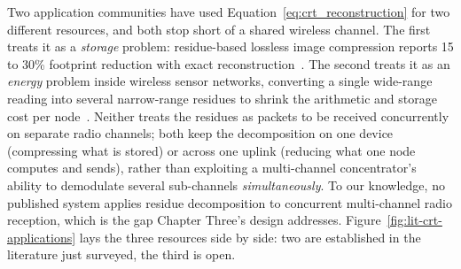 Two application communities have used Equation~\ref{eq:crt_reconstruction}
for two different resources, and both stop short of a shared wireless
channel. The first treats it as a \emph{storage} problem: residue-based
lossless image compression reports 15 to 30\% footprint reduction with
exact reconstruction~\cite{vidhya2021crt}. The second treats it as an
\emph{energy} problem inside wireless sensor networks, converting a
single wide-range reading into several narrow-range residues to shrink the
arithmetic and storage cost per node~\cite{rahman2022rnsenergy,
khan2023fuzzycrt, djeddi2025parallelCRT}. Neither treats the residues as
packets to be received concurrently on separate radio channels; both keep
the decomposition on one device (compressing what is stored) or across one
uplink (reducing what one node computes and sends), rather than exploiting
a multi-channel concentrator's ability to demodulate several sub-channels
\emph{simultaneously}. To our knowledge, no published system applies
residue decomposition to concurrent multi-channel radio reception, which
is the gap Chapter Three's design addresses. Figure~\ref{fig:lit-crt-applications}
lays the three resources side by side: two are established in the
literature just surveyed, the third is open.


